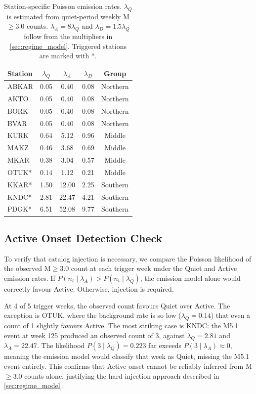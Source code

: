 \begin{table}[h]
    \centering
    \caption{Station-specific Poisson emission rates. $\lambda_Q$ is estimated from 
    quiet-period weekly M$\geq$3.0 counts. $\lambda_A = 8\lambda_Q$ and 
    $\lambda_D = 1.5\lambda_Q$ follow from the multipliers in 
    \cref{sec:regime_model}. Triggered stations are marked with *.}
    \label{tab:emission_params}
    \small
    \begin{tabular}{@{}lcccc@{}}
        \toprule
        Station & $\lambda_Q$ & $\lambda_A$ & $\lambda_D$ & Group \\
        \midrule
        ABKAR  & 0.05 & 0.40  & 0.08 & Northern \\
        AKTO   & 0.05 & 0.40  & 0.08 & Northern \\
        BORK   & 0.05 & 0.40  & 0.08 & Northern \\
        BVAR   & 0.05 & 0.40  & 0.08 & Northern \\
        \midrule
        KURK   & 0.64 & 5.12  & 0.96 & Middle \\
        MAKZ   & 0.46 & 3.68  & 0.69 & Middle \\
        MKAR   & 0.38 & 3.04  & 0.57 & Middle \\
        OTUK*  & 0.14 & 1.12  & 0.21 & Middle \\
        \midrule
        KKAR*  & 1.50 & 12.00 & 2.25 & Southern \\
        KNDC*  & 2.81 & 22.47 & 4.21 & Southern \\
        PDGK*  & 6.51 & 52.08 & 9.77 & Southern \\
        \bottomrule
    \end{tabular}
\end{table}

\subsection{Active Onset Detection Check}
\label{app:multiplier_check}

To verify that catalog injection is necessary, we compare the Poisson likelihood of the observed M$\geq$3.0 count at each trigger week under the Quiet and Active emission rates. If $P(n_t \mid \lambda_A) > P(n_t \mid\lambda_Q)$, the emission model alone would correctly favour Active. Otherwise, injection is required.

\medskip
At 4 of 5 trigger weeks, the observed count favours Quiet over Active. The exception is OTUK, where the background rate is so low ($\lambda_Q = 0.14$) that even a count of 1 slightly favours Active. The most striking case is KNDC: the M5.1 event at week 125 produced an observed count of 3, against $\lambda_Q = 2.81$ and $\lambda_A = 22.47$. The likelihood $P(3 \mid \lambda_Q) = 0.223$ far exceeds $P(3 \mid \lambda_A) \approx 0$, meaning the emission model would classify that week as Quiet, missing the M5.1 event entirely. This confirms that Active onset 
cannot be reliably inferred from M$\geq$3.0 counts alone, justifying the hard injection approach described in \cref{sec:regime_model}.

